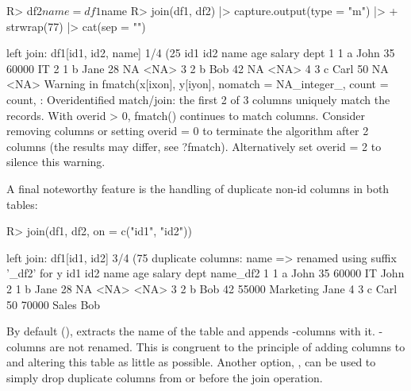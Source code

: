 \documentclass[article]{jss}
\newcommand{\fct}[1]{\code{#1()}}
\begin{document}
\begin{Schunk}
\begin{Sinput}
R> df2$name = df1$name
R> join(df1, df2) |> capture.output(type = "m") |>
+    strwrap(77) |> cat(sep = "\n")
\end{Sinput}
\begin{Soutput}
left join: df1[id1, id2, name] 1/4 (25%) <m:m> df2[id1, id2, name] 1/4 (25%)
  id1 id2 name age salary dept
1   1   a John  35  60000   IT
2   1   b Jane  28     NA <NA>
3   2   b  Bob  42     NA <NA>
4   3   c Carl  50     NA <NA>
Warning in fmatch(x[ixon], y[iyon], nomatch = NA_integer_, count = count, :
Overidentified match/join: the first 2 of 3 columns uniquely match the
records. With overid > 0, fmatch() continues to match columns. Consider
removing columns or setting overid = 0 to terminate the algorithm after 2
columns (the results may differ, see ?fmatch). Alternatively set overid = 2
to silence this warning.
\end{Soutput}
\end{Schunk}
%
A final noteworthy feature is the handling of duplicate non-id columns in both tables:
%
\begin{Schunk}
\begin{Sinput}
R> join(df1, df2, on = c("id1", "id2"))
\end{Sinput}
\begin{Soutput}
left join: df1[id1, id2] 3/4 (75%) <m:m> df2[id1, id2] 3/4 (75%)
duplicate columns: name => renamed using suffix '_df2' for y
  id1 id2 name age salary      dept name_df2
1   1   a John  35  60000        IT     John
2   1   b Jane  28     NA      <NA>     <NA>
3   2   b  Bob  42  55000 Marketing     Jane
4   3   c Carl  50  70000     Sales      Bob
\end{Soutput}
\end{Schunk}
%
By default (), \fct{join} extracts the name of the  table and appends -columns with it. -columns are not renamed. This is congruent to the principle of adding columns to  and altering this table as little as possible. Another option, , can be used to simply drop duplicate columns from  or  before the join operation.
%
\end{document}
